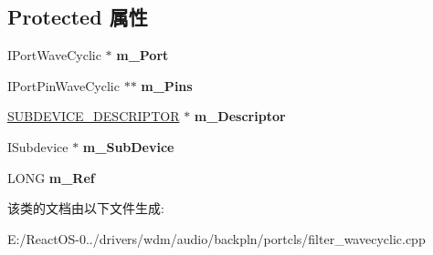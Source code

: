 \subsection*{Protected 属性}
\begin{DoxyCompactItemize}
\item 
\mbox{\label{class_c_port_filter_wave_cyclic_aa94dd9064553672e0bc4f08ed31ce811}} 
I\+Port\+Wave\+Cyclic $\ast$ {\bfseries m\+\_\+\+Port}
\item 
\mbox{\label{class_c_port_filter_wave_cyclic_a4938394dfa96a270a0ac4bc5d4e609ce}} 
I\+Port\+Pin\+Wave\+Cyclic $\ast$$\ast$ {\bfseries m\+\_\+\+Pins}
\item 
\mbox{\label{class_c_port_filter_wave_cyclic_a025b65a71a5ae10e1faa67bde97bb95a}} 
\hyperlink{struct_s_u_b_d_e_v_i_c_e___d_e_s_c_r_i_p_t_o_r}{S\+U\+B\+D\+E\+V\+I\+C\+E\+\_\+\+D\+E\+S\+C\+R\+I\+P\+T\+OR} $\ast$ {\bfseries m\+\_\+\+Descriptor}
\item 
\mbox{\label{class_c_port_filter_wave_cyclic_a01f1d056a402892083786d7100b3b97d}} 
I\+Subdevice $\ast$ {\bfseries m\+\_\+\+Sub\+Device}
\item 
\mbox{\label{class_c_port_filter_wave_cyclic_a07d95e49176879d79fdc8eaa27117fca}} 
L\+O\+NG {\bfseries m\+\_\+\+Ref}
\end{DoxyCompactItemize}


该类的文档由以下文件生成\+:\begin{DoxyCompactItemize}
\item 
E\+:/\+React\+O\+S-\/0../drivers/wdm/audio/backpln/portcls/filter\+\_\+wavecyclic.\+cpp\end{DoxyCompactItemize}
